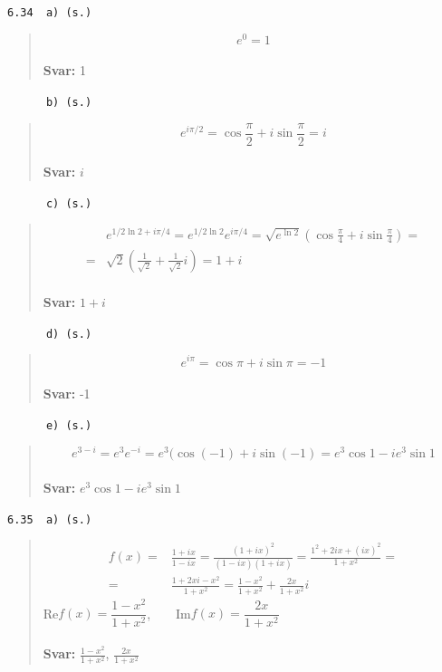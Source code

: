 \documentclass[a4paper]{article}
\newcommand{\tskcol}[1]{\textcolor{tskcol}{#1}}
\begin{document}
	\texttt{\tskcol{6.34~~a) (s.)}}
	\begin{quotation}
		\noindent
		\[e^0=1\]
		\\
		\textbf{Svar:} 1
	\end{quotation}
	
	\texttt{\tskcol{~~~~~~b) (s.)}}
	\begin{quotation}
		\noindent
		\[e^{i\pi/2}=\cos\frac{\pi}{2}+i\sin\frac{\pi}{2}=i\]
		\\
		\textbf{Svar:} $i$
	\end{quotation}
	
	\texttt{\tskcol{~~~~~~c) (s.)}}
	\begin{quotation}
		\noindent
		\begin{align*}
		&e^{1/2\ln2+i\pi/4}=
		e^{1/2\ln 2}e^{i\pi/4}=
		\sqrt{e^{\ln2}}(\cos\frac{\pi}{4}+i\sin\frac{\pi}{4})= \\ =
		&\sqrt{2}\left(\frac{1}{\sqrt{2}}+\frac{1}{\sqrt{2}}i\right)=
		1+i
		\end{align*}
		\\
		\textbf{Svar:} $1+i$
	\end{quotation}
	
	\texttt{\tskcol{~~~~~~d) (s.)}}
	\begin{quotation}
		\noindent
		\[e^{i\pi}=\cos\pi+i\sin\pi=-1\]
		\\
		\textbf{Svar:} -1
	\end{quotation}
	
	\texttt{\tskcol{~~~~~~e) (s.)}}
	\begin{quotation}
		\noindent
		\[e^{3-i}=
		e^3e^{-i}=e^3(\cos(-1)+i\sin(-1)=
		e^3\cos 1- ie^3\sin 1\]
		\\
		\textbf{Svar:} $e^3\cos 1- ie^3\sin 1$
	\end{quotation}
	
	\texttt{\tskcol{6.35~~a) (s.)}}
	\begin{quotation}
		\noindent
		\begin{align*}
		f(x)=&\frac{1+ix}{1-ix}=
		\frac{(1+ix)^2}{(1-ix)(1+ix)}=
		\frac{1^2+2ix+(ix)^2}{1+x^2}= \\ =
		&\frac{1+2xi-x^2}{1+x^2}=
		\frac{1-x^2}{1+x^2}+\frac{2x}{1+x^2}i
		\end{align*}
		Re$f(x)=\dfrac{1-x^2}{1+x^2}$,~~~~Im$f(x)=\dfrac{2x}{1+x^2}$
		\\ \\
		\textbf{Svar:} $\frac{1-x^2}{1+x^2}$, $\frac{2x}{1+x^2}$
	\end{quotation}
	
\end{document}

